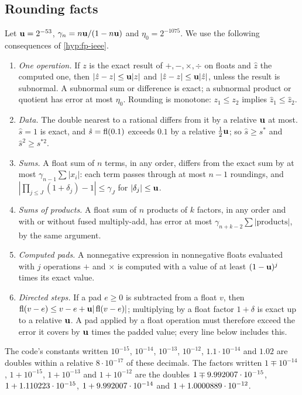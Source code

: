 \subsection{Rounding facts}\label{app:egrounding-facts}

Let $\mathbf{u}=2^{-53}$, $\gamma_n=n\mathbf{u}/(1-n\mathbf{u})$ and $\eta_0=2^{-1075}$.
We use the following consequences of \cref{hyp:fp-ieee}.
\begin{enumerate}
\item[(F0)] \emph{One operation.} If $z$ is the exact result of $+,-,\times,\div$ on floats and $\hat z$ the computed one, then $|\hat z-z|\le\mathbf{u}|z|$ and $|\hat z-z|\le\mathbf{u}|\hat z|$, unless the result is subnormal.
A subnormal sum or difference is exact; a subnormal product or quotient has error at most $\eta_0$.
Rounding is monotone: $z_1\le z_2$ implies $\hat z_1\le\hat z_2$.
\item[(F1)] \emph{Data.} The double nearest to a rational differs from it by a relative $\mathbf{u}$ at most.
$\hat s=1$ is exact, and $\hat s=\operatorname{fl}(0.1)$ exceeds $0.1$ by a relative $\frac12\mathbf{u}$; so $\hat s\ge s^*$ and $\hat s^2\ge s^{*2}$.
\item[(F2)] \emph{Sums.} A float sum of $n$ terms, in any order, differs from the exact sum by at most $\gamma_{n-1}\sum|x_i|$: each term passes through at most $n-1$ roundings, and $|\prod_{j\le J}(1+\delta_j)-1|\le\gamma_J$ for $|\delta_j|\le\mathbf{u}$.
\item[(F3)] \emph{Sums of products.} A float sum of $n$ products of $k$ factors, in any order and with or without fused multiply-add, has error at most $\gamma_{n+k-2}\sum|\text{products}|$, by the same argument.
\item[(F4)] \emph{Computed pads.} A nonnegative expression in nonnegative floats evaluated with $j$ operations $+$ and $\times$ is computed with a value of at least $(1-\mathbf{u})^j$ times its exact value.
\item[(F5)] \emph{Directed steps.} If a pad $e\ge0$ is subtracted from a float $v$, then $\operatorname{fl}(v-e)\le v-e+\mathbf{u}|\operatorname{fl}(v-e)|$; multiplying by a float factor $1+\delta$ is exact up to a relative $\mathbf{u}$.
A pad applied by a float operation must therefore exceed the error it covers by $\mathbf{u}$ times the padded value; every line below includes this.
\end{enumerate}
The code's constants written $10^{-15}$, $10^{-14}$, $10^{-13}$, $10^{-12}$, $1.1\cdot10^{-14}$ and $1.02$ are doubles within a relative $8\cdot10^{-17}$ of these decimals.
The factors written $1\mp10^{-14}$, $1+10^{-15}$, $1+10^{-13}$ and $1+10^{-12}$ are the doubles $1\mp9.992007\cdot 10^{-15}$, $1+1.110223\cdot 10^{-15}$, $1+9.992007\cdot 10^{-14}$ and $1+1.0000889\cdot 10^{-12}$.
